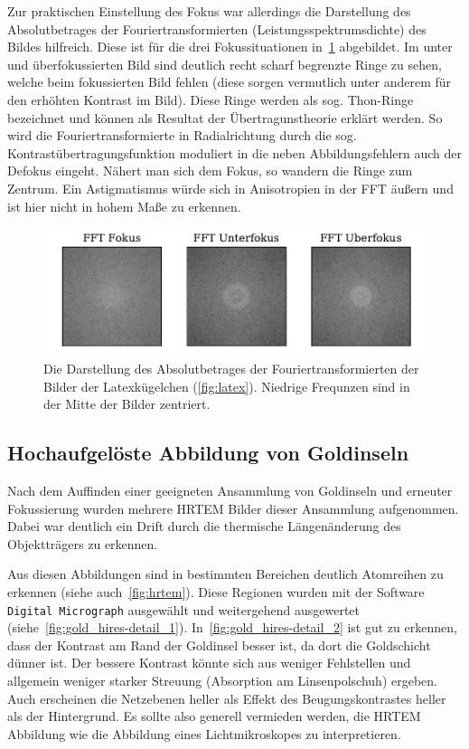 \documentclass[slug=TEM, room=IFW, supervisor=?, coursedate=23.\ 01.\ 2020]{../../Lab_Report_LaTeX/lab_report}
\begin{document}
Zur praktischen Einstellung des Fokus war allerdings die Darstellung
des Absolutbetrages der Fouriertransformierten
(Leistungsspektrumsdichte) des Bildes hilfreich. Diese ist f\"ur die
drei Fokussituationen in~\ref{fig:latex_kugel-latex_fft}
abgebildet. Im unter und \"uberfokussierten Bild sind deutlich recht
scharf begrenzte Ringe zu sehen, welche beim fokussierten Bild fehlen
(diese sorgen vermutlich unter anderem f\"ur den erh\"ohten Kontrast
im Bild). Diese Ringe werden als sog. Thon-Ringe bezeichnet und
k\"onnen als Resultat der \"Ubertragunstheorie erkl\"art werden. So
wird die Fouriertransformierte in Radialrichtung durch die
sog. Kontrast\"ubertragungsfunktion moduliert in die neben
Abbildungsfehlern auch der Defokus eingeht. N\"ahert man sich dem Fokus, so
wandern die Ringe zum Zentrum. Ein Astigmatismus w\"urde sich in
Anisotropien in der FFT \"au\ss{}ern und ist hier nicht in hohem
Ma\ss{}e zu erkennen.

\begin{figure}[h]\centering
  \includegraphics[width=\textwidth]{../auswertung/figs/latex_kugel/latex_fft.pdf}
  \caption{Die Darstellung des Absolutbetrages der
    Fouriertransformierten der Bilder der Latexkügelchen
    (\ref{fig:latex}). Niedrige Frequnzen sind in der Mitte der
    Bilder zentriert.}
  \label{fig:latex_kugel-latex_fft}
\end{figure}

\subsection{Hochaufgel\"oste Abbildung von Goldinseln}
\label{sec:hrtem}

Nach dem Auffinden einer geeigneten Ansammlung von Goldinseln und erneuter
Fokussierung wurden mehrere HRTEM Bilder dieser Ansammlung
aufgenommen. Dabei war deutlich ein Drift durch die thermische
L\"angen\"anderung des Objekttr\"agers zu erkennen.

Aus diesen Abbildungen sind in bestimmten Bereichen deutlich
Atomreihen zu erkennen (siehe auch~\ref{fig:hrtem}). Diese Regionen
wurden mit der Software \verb|Digital Micrograph| ausgew\"ahlt und
weitergehend ausgewertet
(siehe~\ref{fig:gold_hires-detail_1}). In~\ref{fig:gold_hires-detail_2}
ist gut zu erkennen, dass der Kontrast am Rand der Goldinsel besser
ist, da dort die Goldschicht d\"unner ist. Der bessere Kontrast
k\"onnte sich aus weniger Fehlstellen und allgemein weniger starker
Streuung (Absorption am Linsenpolschuh) ergeben. Auch erscheinen die
Netzebenen heller als Effekt des Beugungskontrastes heller als der
Hintergrund. Es sollte also generell vermieden werden, die HRTEM
Abbildung wie die Abbildung eines Lichtmikroskopes zu interpretieren.
\end{document}
